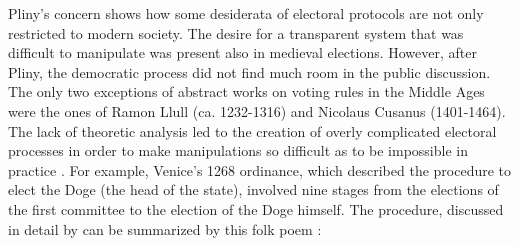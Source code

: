 Pliny's concern shows how some desiderata of electoral protocols are not only restricted to modern society. The desire for a transparent system that was difficult to manipulate was present also in medieval elections. However, after Pliny, the democratic process did not find much room in the public discussion. The only two exceptions of abstract works on voting rules in the Middle Ages were the ones of Ramon Llull (ca. 1232-1316) and Nicolaus Cusanus (1401-1464). The lack of theoretic analysis led to the creation of overly complicated electoral processes in order to make manipulations so difficult as to be impossible in practice \citep{Uckelman2010}. For example, Venice's 1268 ordinance, which described the procedure to elect the Doge (the head of the state), involved nine stages from the elections of the first committee to the election of the Doge himself. The procedure, discussed in detail by \citet{Lines1986, Coggins1998, Mowbray2007} can be summarized by this folk poem \citep[p.79]{Doglioni1666}:
\vspace{1em}
